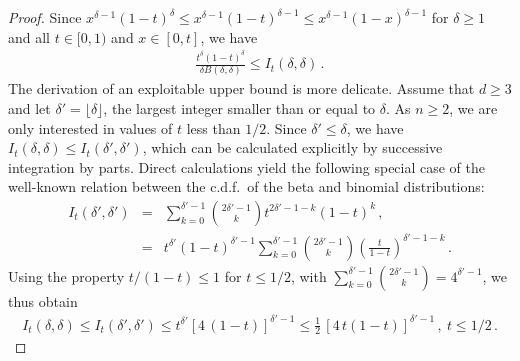 \documentclass[10pt,a4paper]{amsart}
\newcommand{\AZ}{\textcolor{blue}}
\newcommand{\be}{\begin{eqnarray}}
\newcommand{\bea}{\begin{eqnarray*}}
\newcommand{\ee}{\end{eqnarray}}
\newcommand{\eea}{\end{eqnarray*}}
\begin{document}
\begin{proof}
Since $x^{\delta-1}(1-t)^\delta\leq x^{\delta-1}(1-t)^{\delta-1}\leq x^{\delta-1}(1-x)^{\delta-1}$ for $\delta\geq 1$ and all $t\in[0,1)$ and $x\in[0,t]$, we have
\be\label{It-ineq1}
\frac{t^\delta (1-t)^\delta}{\delta B(\delta,\delta)} \leq I_t(\delta,\delta) \,. %
\ee
The derivation of an exploitable upper bound is more delicate.
Assume that $d \geq 3$ and let
$\delta'=\lfloor \delta \rfloor$, the largest integer smaller than or equal to $\delta$.
As $n\geq 2$, we are only interested in values of $t$ less than $1/2$. Since $\delta'\leq \delta$, we have $I_t(\delta,\delta) \leq I_t(\delta',\delta')$, which
can be calculated explicitly by successive integration by parts. Direct calculations yield the following special case of the well-known relation between the c.d.f.\ of the beta and binomial distributions:
\be\label{It1}
I_t(\delta',\delta') &=& \sum_{k=0}^{\delta'-1} \binom{2\delta'-1}{k} t^{2\delta'-1-k}(1-t)^k \,, \\
&=& t^{\delta'}(1-t)^{\delta'-1} \sum_{k=0}^{\delta'-1} \binom{2\delta'-1}{k} \left(\frac{t}{1-t}\right)^{\delta'-1-k} \,.
\ee
Using the property $t/(1-t) \leq 1$ for $t\leq 1/2$, with $\sum_{k=0}^{\delta'-1} \binom{2\delta'-1}{k}=4^{\delta'-1}$, we thus obtain
\be \label{upper_bound}
I_t(\delta,\delta) \leq I_t(\delta',\delta') \leq t^{\delta'}[4\,(1-t)]^{\delta'-1} \leq \frac12\,[4\,t(1-t)]^{\delta'-1}\,, \ t\leq 1/2\,.
\ee


\end{proof}
\end{document}
